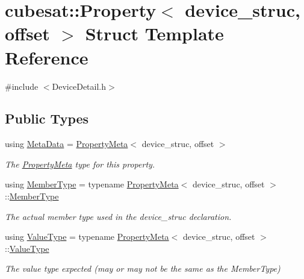 \hypertarget{structcubesat_1_1Property}{}\section{cubesat\+:\+:Property$<$ device\+\_\+struc, offset $>$ Struct Template Reference}
\label{structcubesat_1_1Property}


{\ttfamily \#include $<$Device\+Detail.\+h$>$}

\subsection*{Public Types}
\begin{DoxyCompactItemize}
\item 
using \hyperlink{structcubesat_1_1Property_abde80e33ecde1656ac9035d4b52477ce}{Meta\+Data} = \hyperlink{structcubesat_1_1PropertyMeta}{Property\+Meta}$<$ device\+\_\+struc, offset $>$
\begin{DoxyCompactList}\small\item\em The \hyperlink{structcubesat_1_1PropertyMeta}{Property\+Meta} type for this property. \end{DoxyCompactList}\item 
using \hyperlink{structcubesat_1_1Property_a01cc6c681c8f3dcb97f16d186a04ca73}{Member\+Type} = typename \hyperlink{structcubesat_1_1PropertyMeta}{Property\+Meta}$<$ device\+\_\+struc, offset $>$\+::\hyperlink{structcubesat_1_1Property_a01cc6c681c8f3dcb97f16d186a04ca73}{Member\+Type}
\begin{DoxyCompactList}\small\item\em The actual member type used in the device\+\_\+struc declaration. \end{DoxyCompactList}\item 
using \hyperlink{structcubesat_1_1Property_a24aaec6241faac15f50c63bb6c972fd4}{Value\+Type} = typename \hyperlink{structcubesat_1_1PropertyMeta}{Property\+Meta}$<$ device\+\_\+struc, offset $>$\+::\hyperlink{structcubesat_1_1Property_a24aaec6241faac15f50c63bb6c972fd4}{Value\+Type}
\begin{DoxyCompactList}\small\item\em The value type expected (may or may not be the same as the Member\+Type) \end{DoxyCompactList}\end{DoxyCompactItemize}

